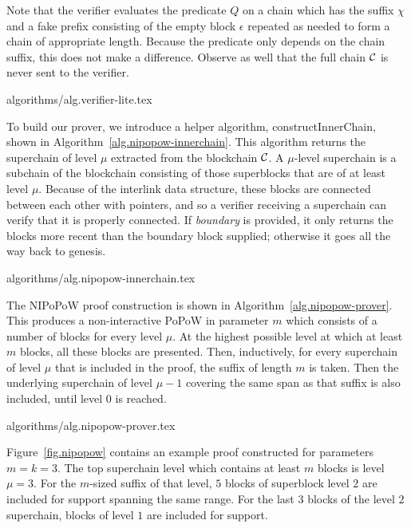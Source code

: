 Note that the verifier evaluates the predicate $Q$ on a chain which has the
suffix $\chi$ and a fake prefix consisting of the empty block $\epsilon$
repeated as needed to form a chain of appropriate length. Because the predicate
only depends on the chain suffix, this does not make a difference. Observe as
well that the full chain $\mathcal{C}$ is never sent to the verifier.

{algorithms/alg.verifier-lite.tex}

To build our prover, we introduce a helper algorithm, constructInnerChain,
shown in Algorithm~\ref{alg.nipopow-innerchain}. This algorithm returns the
superchain of level $\mu$ extracted from the blockchain $\mathcal{C}$. A
$\mu$-level superchain is a subchain of the blockchain consisting of those
superblocks that are of at least level $\mu$. Because of the interlink data
structure, these blocks are connected between each other with pointers, and so
a verifier receiving a superchain can verify that it is properly connected.
If \textit{boundary} is provided, it only returns the blocks more recent than
the boundary block supplied; otherwise it goes all the way back to genesis.

{algorithms/alg.nipopow-innerchain.tex}

The NIPoPoW proof construction is shown in Algorithm~\ref{alg.nipopow-prover}.
This produces a non-interactive PoPoW in parameter $m$ which consists of a
number of blocks for every level $\mu$. At the highest possible level at which
at least $m$ blocks, all these blocks are presented. Then, inductively, for
every superchain of level $\mu$ that is included in the proof, the suffix of
length $m$ is taken. Then the underlying superchain of level $\mu - 1$ covering
the same span as that suffix is also included, until level $0$ is reached.

{algorithms/alg.nipopow-prover.tex}


Figure~\ref{fig.nipopow} contains an example proof constructed for parameters
$m = k = 3$. The top superchain level which contains at least $m$ blocks is
level $\mu = 3$. For the $m$-sized suffix of that level, $5$ blocks of
superblock level $2$ are included for support spanning the same range. For the
last $3$ blocks of the level $2$ superchain, blocks of level $1$ are included
for support.

